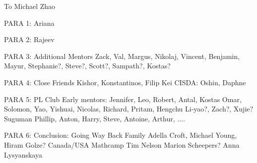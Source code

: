 To Michael Zhao

PARA 1: Ariana

PARA 2: Rajeev

PARA 3: Additional Mentors
Zack, Val, Margus, Nikolaj, Vincent, Benjamin, Mayur, Stephanie?, Steve?, Scott?, Sampath?, Kostas?

PARA 4: Close Friends
Kishor, Konstantinos, Filip
Kei
CISDA: Oshin, Daphne

PARA 5: PL Club
Early mentors: Jennifer, Leo, Robert, Antal, Kostas
Omar, Solomon, Yao, Yishuai, Nicolas, Richard, Pritam, Hengchu
Li-yao?, Zach?, Xujie?
Suguman
Phillip, Anton, Harry, Steve, Antoine, Arthur, ....

PARA 6: Conclusion: Going Way Back
Family
Adella Croft, Michael Young, Hiram Golze?
Canada/USA Mathcamp
Tim Nelson
Marion Scheepers?
Anna Lysyanskaya
